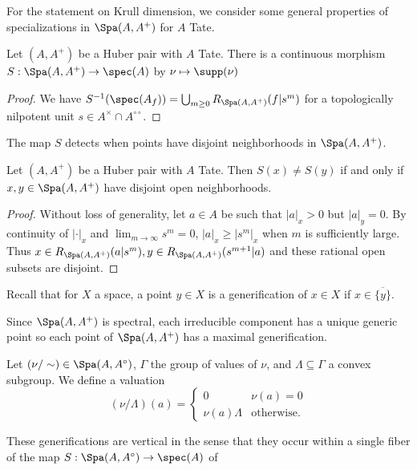 For the statement on Krull dimension, we consider some general properties of specializations in $\Spa(A,A^{+})$ for $A$ Tate. 
\begin{lemma}\label{lem: cts map to spec A}
    Let $(A,A^{+})$ be a Huber pair with $A$ Tate. There is a continuous morphism $S:\Spa(A,A^{+})\to\spec(A)$ by $\nu\mapsto\supp(\nu)$
\end{lemma}
\begin{proof}
    We have $S^{-1}(\spec(A_{f}))=\bigcup_{m\geq0}R_{\Spa(A,A^{+})}(f|s^{m})$ for a topologically nilpotent unit $s\in A^{\times}\cap A^{\circ\circ}$. 
\end{proof}
The map $S$ detects when points have disjoint neighborhoods in $\Spa(A,A^{+})$. 
\begin{lemma}\label{lem: disjoint neighborhoods on Spa}
    Let $(A,A^{+})$ be a Huber pair with $A$ Tate. Then $S(x)\neq S(y)$ if and only if $x,y\in\Spa(A,A^{+})$ have disjoint open neighborhoods. 
\end{lemma}
\begin{proof}
    Without loss of generality, let $a\in A$ be such that $|a|_{x}>0$ but $|a|_{y}=0$. By continuity of $|\cdot|_{x}$ and $\lim_{m\to\infty}s^{m}=0$, $|a|_{x}\geq|s^{m}|_{x}$ when $m$ is sufficiently large. Thus $x\in R_{\Spa(A,A^{+})}(a|s^{m}),y\in R_{\Spa(A,A^{+})}(s^{m+1}|a)$ and these rational open subsets are disjoint. 
\end{proof}
Recall that for $X$ a space, a point $y\in X$ is a generification of $x\in X$ if $x\in\overline{\{y\}}$. 
\begin{remark}
    Since $\Spa(A,A^{+})$ is spectral, each irreducible component has a unique generic point so each point of $\Spa(A,A^{+})$ has a maximal generification.
\end{remark}
\begin{definition}\label{def: vertical generification}
    Let $(\nu/\sim)\in\Spa(A,A^{\circ})$, $\Gamma$ the group of values of $\nu$, and $\Lambda\subseteq\Gamma$ a convex subgroup. We define a valuation 
    $$(\nu/\Lambda)(a)=\begin{cases}
        0 & \nu(a) = 0 \\
        \nu(a)\Lambda & \text{otherwise.}
    \end{cases}$$ 
\end{definition}
These generifications are vertical in the sense that they occur within a single fiber of the map $S:\Spa(A,A^{\circ})\to\spec(A)$ of 
